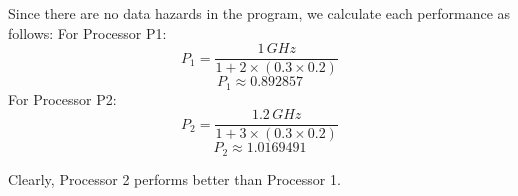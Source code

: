 \documentclass[12pt]{article}
\begin{document}
Since there are no data hazards in the program, we calculate each performance as follows:
For Processor P1:
\begin{equation*}
    P_1 = \frac{1 \, GHz}{1 + 2 \times (0.3 \times 0.2)}
\end{equation*}
\begin{equation*}
    P_1 \approx 0.892857
\end{equation*}
For Processor P2:
\begin{equation*}
    P_2 = \frac{1.2 \, GHz}{1 + 3 \times (0.3 \times 0.2)}
\end{equation*}
\begin{equation*}
    P_2 \approx 1.0169491
\end{equation*}

Clearly, Processor 2 performs better than Processor 1.

\end{document}
